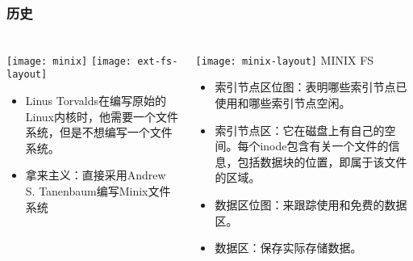 \begin{frame}[fragile]
	\frametitle{历史}
	
	\frametitle{ }
	\begin{columns}[t]
		\begin{column}{.4\textwidth}
			\texttt{[image: minix]}
			\texttt{[image: ext-fs-layout]}
			
			\begin{itemize}
				\item Linus Torvalds在编写原始的Linux内核时，他需要一个文件系统，但是不想编写一个文件系统。
				\item 拿来主义：直接采用Andrew S. Tanenbaum编写Minix文件系统
			\end{itemize}
			
		\end{column}
		
		\begin{column}{.6\textwidth}			
			\texttt{[image: minix-layout]}
			MINIX FS
			\begin{itemize}
				\item 索引节点区位图：表明哪些索引节点已使用和哪些索引节点空闲。
				\item 索引节点区：它在磁盘上有自己的空间。每个inode包含有关一个文件的信息，包括数据块的位置，即属于该文件的区域。
				\item 数据区位图：来跟踪使用和免费的数据区。
				\item 数据区：保存实际存储数据。
			\end{itemize}
			
		\end{column}
	\end{columns}
	
\end{frame}


